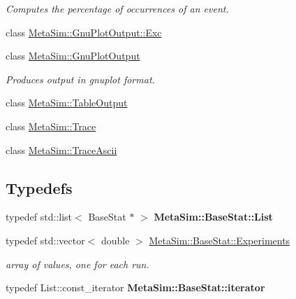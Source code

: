 \begin{DoxyCompactItemize}
\begin{DoxyCompactList}\small\item\em Computes the percentage of occurrences of an event. \end{DoxyCompactList}\item 
class \hyperlink{classMetaSim_1_1GnuPlotOutput_1_1Exc}{Meta\+Sim\+::\+Gnu\+Plot\+Output\+::\+Exc}
\item 
class \hyperlink{classMetaSim_1_1GnuPlotOutput}{Meta\+Sim\+::\+Gnu\+Plot\+Output}
\begin{DoxyCompactList}\small\item\em Produces output in gnuplot format. \end{DoxyCompactList}\item 
class \hyperlink{classMetaSim_1_1TableOutput}{Meta\+Sim\+::\+Table\+Output}
\item 
class \hyperlink{classMetaSim_1_1Trace}{Meta\+Sim\+::\+Trace}
\item 
class \hyperlink{classMetaSim_1_1TraceAscii}{Meta\+Sim\+::\+Trace\+Ascii}
\end{DoxyCompactItemize}
\subsection*{Typedefs}
\begin{DoxyCompactItemize}
\item 
typedef std\+::list$<$ Base\+Stat $\ast$ $>$ {\bfseries Meta\+Sim\+::\+Base\+Stat\+::\+List}\hypertarget{group__metasim__stat_ga526dbfb07dff9df4cfcd82445bd3e7ae}{}\label{group__metasim__stat_ga526dbfb07dff9df4cfcd82445bd3e7ae}

\item 
typedef std\+::vector$<$ double $>$ \hyperlink{group__metasim__stat_ga2bae1d8abdacdd19f279cba4b73f4b7e}{Meta\+Sim\+::\+Base\+Stat\+::\+Experiments}\hypertarget{group__metasim__stat_ga2bae1d8abdacdd19f279cba4b73f4b7e}{}\label{group__metasim__stat_ga2bae1d8abdacdd19f279cba4b73f4b7e}

\begin{DoxyCompactList}\small\item\em array of values, one for each run. \end{DoxyCompactList}\item 
typedef List\+::const\+\_\+iterator {\bfseries Meta\+Sim\+::\+Base\+Stat\+::iterator}\hypertarget{group__metasim__stat_gad548fda3e3e24991474cbee77f300eac}{}\label{group__metasim__stat_gad548fda3e3e24991474cbee77f300eac}

\end{DoxyCompactItemize}
